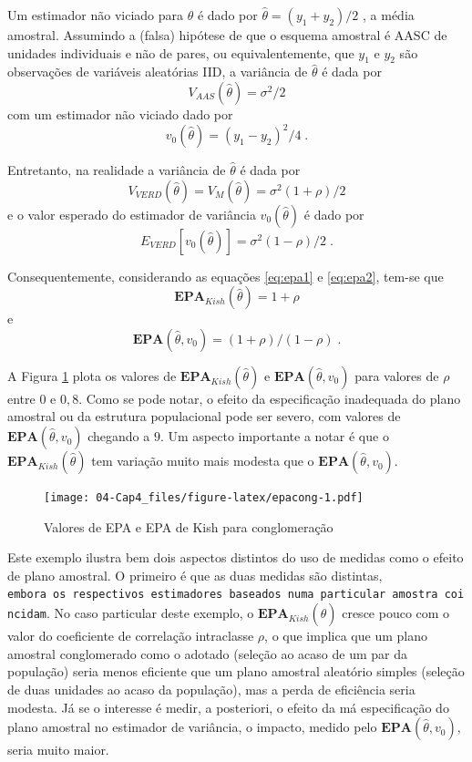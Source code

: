 \documentclass[]{book}
\theoremstyle{definition}
\theoremstyle{definition}
\theoremstyle{definition}
\theoremstyle{remark}
\begin{document}
Um estimador não viciado para \(\theta\) é dado por
\(\widehat{\theta }=(y_{1}+y_{2})/2\) , a média amostral. Assumindo a
(falsa) hipótese de que o esquema amostral é AASC de unidades
individuais e não de pares, ou equivalentemente, que \(y_{1}\) e
\(y_{2}\) são observações de variáveis aleatórias IID, a variância de
\(\widehat{\theta }\) é dada por \[
V_{AAS}\left( \widehat{\theta }\right) =\sigma ^{2}/2 
\] com um estimador não viciado dado por \[
v_{0}\left( \widehat{\theta }\right) =(y_{1}-y_{2})^{2}/4\;. 
\]

Entretanto, na realidade a variância de \(\widehat{\theta }\) é dada por
\[
V_{VERD}\left( \widehat{\theta }\right) =V_{M}\left( \widehat{\theta }
\right) =\sigma ^{2}(1+\rho )/2 
\] e o valor esperado do estimador de variância
\(v_{0}\left( \widehat{\theta }\right)\) é dado por \[
E_{VERD}\left[ v_{0}\left( \widehat{\theta }\right) \right] =\sigma
^{2}(1-\rho )/2\;. 
\]

Consequentemente, considerando as equações \eqref{eq:epa1} e
\eqref{eq:epa2}, tem-se que \[
\mathbf{EPA}_{Kish}\left( \hat{\theta}\right) =1+\rho 
\] e \[
\mathbf{EPA}\left( \hat{\theta},v_{0}\right) =(1+\rho )/(1-\rho )\;. 
\]

A Figura \ref{fig:epacong} plota os valores de
\(\mathbf{EPA}_{Kish}\left( \hat{\theta}\right)\) e
\(\mathbf{EPA}\left( \hat{\theta},v_{0}\right)\) para valores de
\(\rho\) entre \(0\) e \(0,8\). Como se pode notar, o efeito da
especificação inadequada do plano amostral ou da estrutura populacional
pode ser severo, com valores de
\(\mathbf{EPA}\left( \hat{\theta},v_{0}\right)\) chegando a \(9\). Um
aspecto importante a notar é que o
\(\mathbf{EPA}_{Kish}\left( \hat{\theta}\right)\) tem variação muito
mais modesta que o \(\mathbf{EPA}\left( \hat{\theta},v_{0}\right)\).

\begin{figure}
\centering
\texttt{[image: 04-Cap4\_files/figure-latex/epacong-1.pdf]}
\caption{\label{fig:epacong}Valores de EPA e EPA de Kish para conglomeração}
\end{figure}

Este exemplo ilustra bem dois aspectos distintos do uso de medidas como
o efeito de plano amostral. O primeiro é que as duas medidas são
distintas,
\texttt{embora\ os\ respectivos\ estimadores\ baseados\ numa\ particular\ amostra\ coincidam}.
No caso particular deste exemplo, o
\(\mathbf{EPA}_{Kish}\left( \hat{\theta}\right)\) cresce pouco com o
valor do coeficiente de correlação intraclasse \(\rho\), o que implica
que um plano amostral conglomerado como o adotado (seleção ao acaso de
um par da população) seria menos eficiente que um plano amostral
aleatório simples (seleção de duas unidades ao acaso da população), mas
a perda de eficiência seria modesta. Já se o interesse é medir, a
posteriori, o efeito da má especificação do plano amostral no estimador
de variância, o impacto, medido pelo
\(\mathbf{EPA}\left( \hat{\theta},v_{0}\right)\), seria muito maior.
\end{document}
